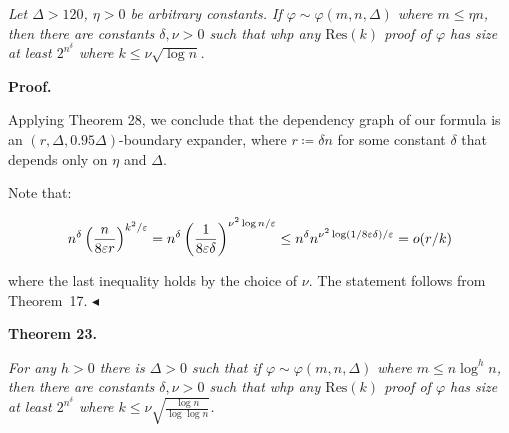 \documentclass[10pt,a4paper]{article}
\begin{document}
\emph{Let $\Delta>120$, $\eta>0$ be arbitrary constants. If $\varphi\sim\varphi(m,n,\Delta)$
where $m\leq\eta n$, then there are constants $\delta,\nu>0$ such that whp any $\mathrm{Res}(k)$ proof of
$\varphi$ has size at least $2^{n^{\delta}}$ where $k\leq\nu\sqrt{\log{n}}$.}\par






\par\medskip\noindent\textbf{Proof.}\par




Applying Theorem 28, we conclude that the
dependency graph of our formula is an $(r,\Delta,0.95\Delta)$-boundary expander, where $r\coloneqq\delta n$ for some constant $\delta$ that depends only on $\eta$ and $\Delta$.\par




Note that:\par


\[\begin{gathered}
n^{\delta}\left(\frac{n}{8\varepsilon r}\right)^{k^{2}/\varepsilon}=n^{\delta}%
\left(\frac{1}{8\varepsilon\delta}\right)^{\nu^{2}\log n/\varepsilon}\leq n^{%
\delta}n^{\nu^{2}\log(1/8\varepsilon\delta)/\varepsilon}=o(r/k)
\end{gathered}\]


where the last inequality holds by the choice of $\nu$. The statement follows from Theorem 17.
$\blacktriangleleft$\par





\par\medskip\noindent\textbf{
\textbf{Theorem 23}\textbf{.}
}\par



\emph{For any $h>0$ there is $\Delta>0$ such that if $\varphi\sim\varphi(m,n,\Delta)$ where
$m\leq n\log^{h}n$, then there are constants $\delta,\nu>0$ such that whp any $\mathrm{Res}(k)$ proof of
$\varphi$ has size at least $2^{n^{\delta}}$ where $k\leq\nu\sqrt{\frac{\log{n}}{\log\log n}}$.}\par



\end{document}
